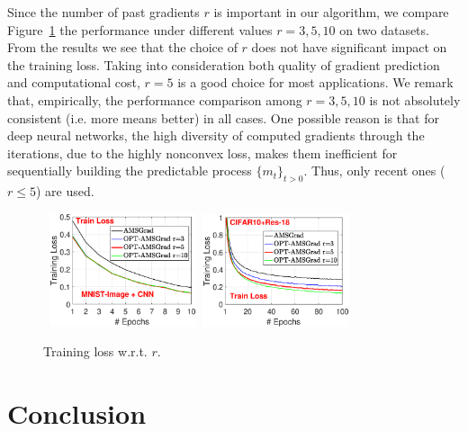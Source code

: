 \documentclass[twoside]{article}
\begin{document}
Since the number of past gradients $r$ is important in our algorithm, we compare Figure~\ref{fig:compare} the performance under different values $r=3,5,10$ on two datasets. 
From the results we see that the choice of $r$ does not have significant impact on the training loss.
Taking into consideration both quality of gradient prediction and computational cost, $r=5$ is a good choice for most applications. 
We remark that, empirically, the performance comparison among $r=3,5,10$ is not absolutely consistent (i.e. more means better) in all cases. 
One possible reason is that for deep neural networks, the high diversity of computed gradients through the iterations, due to the highly nonconvex loss, makes them inefficient for sequentially building the predictable process $\{m_t\}_{t>0}$. 
Thus, only recent ones ($r \leq 5$) are used.
\begin{figure}[H]
\mbox{\hspace{-0.1in}
\includegraphics[width=1.7in]{new_figure/new_mnist_img_figure/mnist_img_train_loss_r3510_2.eps}\hspace{-0.1in}
\includegraphics[width=1.7in]{new_figure/cifar10_train_loss_r3510.eps}
}
\vspace{-0.05in}
\caption{Training loss w.r.t. $r$.}\label{fig:compare}\vspace{-0.1in}
\end{figure}


\vspace{-0.1in}
\section{Conclusion}
\vspace{-0.05in}
\end{document}
